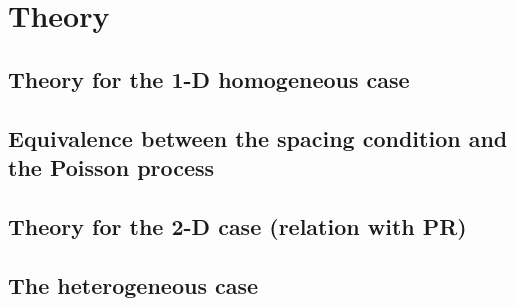\documentclass[12pt]{article}
\newcommand{\1}{\mathbf{1}}
\theoremstyle{plain}
\theoremstyle{definition}
\theoremstyle{remark}
\theoremstyle{plain}
\theoremstyle{remark}
\theoremstyle{plain}
\theoremstyle{plain}
\begin{document}
\section{Theory}

\subsection{Theory for the 1-D homogeneous case}

\subsection{Equivalence between the spacing condition and the Poisson process}

\subsection{Theory for the 2-D case (relation with PR)}

\subsection{The heterogeneous case}
\end{document}
